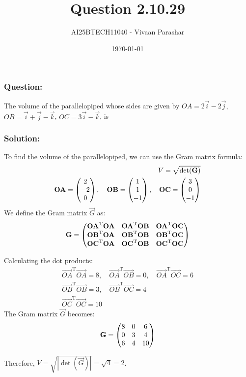 \documentclass{beamer}
\title{Question 2.10.29}
\author{AI25BTECH11040 - Vivaan Parashar}
\date{\today}
\begin{document}
\frame{\titlepage}

\begin{frame}
    \frametitle{Question: }
    The volume of the parallelopiped whose sides are given by $\textit{OA} = 2\vec{i}-2\vec{j}$, $\textit{OB} = \vec{i}+\vec{j}-\vec{k}$, $\textit{OC} = 3\vec{i} - \vec{k}$, is
\end{frame}

\begin{frame}
    \frametitle{Solution: }
    To find the volume of the parallelopiped, we can use the Gram matrix formula:
    \begin{align}
        V = \sqrt{\det(\mathbf{G})} \\
        \mathbf{OA} = \begin{pmatrix}2      \\ -2 \\ 0\end{pmatrix}, \quad
        \mathbf{OB} = \begin{pmatrix}1      \\ 1 \\ -1\end{pmatrix}, \quad
        \mathbf{OC} = \begin{pmatrix}3      \\ 0 \\ -1\end{pmatrix}\\
    \end{align}
    We define the Gram matrix $\vec{G}$ as:
    \begin{align}
        \mathbf{G} = \begin{pmatrix}\mathbf{OA}^{\mathrm{T}}\mathbf{OA} & \mathbf{OA}^{\mathrm{T}}\mathbf{OB} & \mathbf{OA}^{\mathrm{T}}\mathbf{OC}  \\
        \mathbf{OB}^{\mathrm{T}}\mathbf{OA}                  & \mathbf{OB}^{\mathrm{T}}\mathbf{OB} & \mathbf{OB}^{\mathrm{T}}\mathbf{OC}  \\
        \mathbf{OC}^{\mathrm{T}}\mathbf{OA}                  & \mathbf{OC}^{\mathrm{T}}\mathbf{OB} & \mathbf{OC}^{\mathrm{T}}\mathbf{OC}\end{pmatrix}
    \end{align}
\end{frame}
\begin{frame}
    Calculating the dot products:
    \begin{align}
        \vec{OA}^{\mathrm{T}}\vec{OA} = 8, \quad
        \vec{OA}^{\mathrm{T}}\vec{OB} = 0, \quad
        \vec{OA}^{\mathrm{T}}\vec{OC} = 6 \\
        \vec{OB}^{\mathrm{T}}\vec{OB} = 3, \quad
        \vec{OB}^{\mathrm{T}}\vec{OC} = 4 \\
        \vec{OC}^{\mathrm{T}}\vec{OC} = 10
    \end{align}
    The Gram matrix $\vec{G}$ becomes:
    \begin{align}
        \mathbf{G} = \begin{pmatrix}
        8 & 0 & 6  \\
        0 & 3 & 4  \\
        6 & 4 & 10
        \end{pmatrix}
    \end{align}

    Therefore, $V = \sqrt{|\det(\vec{G})|} = \sqrt{4} = 2$.
\end{frame}
\end{document}
